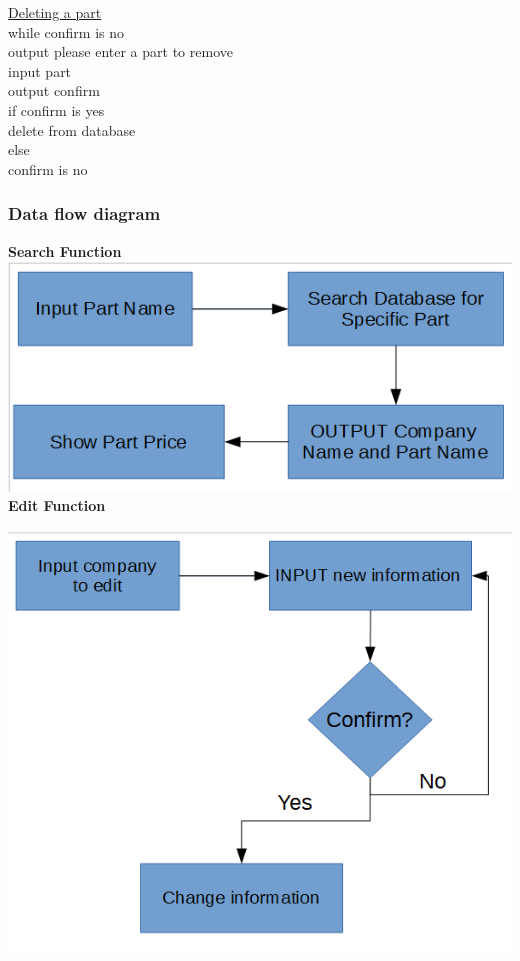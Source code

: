\underline{Deleting a part}\\
while confirm is no\\
output please enter a part to remove\\
input part\\
output confirm\\
if confirm is yes\\
delete from database\\
else \\
confirm is no

\subsubsection{Data flow diagram}
\begin{flushleft}
\textbf{Search Function}\\
\includegraphics[scale=0.7]{FC1.jpg}\\
\clearpage
\textbf{Edit Function}\\\par
\includegraphics[scale=0.71]{FC2.jpg}\\

\end{flushleft}
